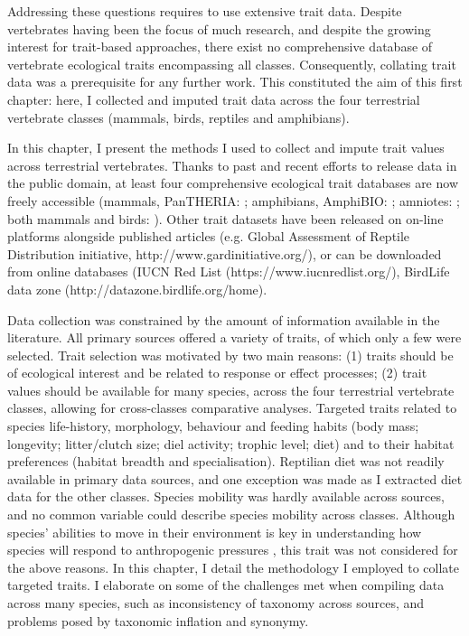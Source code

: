 Addressing these questions requires to use extensive trait data. Despite vertebrates having been the focus of much research, and despite the growing interest for trait-based approaches, there exist no comprehensive database of vertebrate ecological traits encompassing all classes. Consequently, collating trait data was a prerequisite for any further work. This constituted the aim of this first chapter: here, I collected and imputed trait data across the four terrestrial vertebrate classes (mammals, birds, reptiles and amphibians).

In this chapter, I present the methods I used to collect and impute trait values across terrestrial vertebrates. Thanks to past and recent efforts to release data in the public domain, at least four comprehensive ecological trait databases are now freely accessible (mammals, PanTHERIA: \cite{Jones2009}; amphibians, AmphiBIO: \cite{Oliveira2017}; amniotes: \cite{Myhrvold2015}; both mammals and birds: \cite{Cooke2019}). Other trait datasets have been released on on-line platforms alongside published articles (e.g. Global Assessment of Reptile Distribution initiative, http://www.gardinitiative.org/), or can be downloaded from online databases (IUCN Red List (https://www.iucnredlist.org/), BirdLife data zone (http://datazone.birdlife.org/home). 

Data collection was constrained by the amount of information available in the literature.  All  primary sources offered a variety of traits, of which only a few were selected. Trait selection was motivated by two main reasons: (1) traits should be of ecological interest and be related to response or effect processes; (2) trait values should be available for many species, across the four terrestrial vertebrate classes, allowing for cross-classes comparative analyses. Targeted traits related to species life-history, morphology, behaviour and feeding habits (body mass; longevity; litter/clutch size; diel activity; trophic level; diet) and to their habitat preferences (habitat breadth and specialisation). Reptilian diet was not readily available in primary data sources, and one exception was made as I extracted diet data for the other classes. Species mobility was hardly available across sources, and no common variable could describe species mobility across classes. Although species' abilities to move in their environment is key in understanding how species will respond to anthropogenic pressures \citep{Schloss2012b, Barbet-Massin2012,Pearson2006}, this trait was not considered for the above reasons. In this chapter, I detail the methodology I employed to collate targeted traits. I elaborate on some of the challenges met when compiling data across many species, such as inconsistency of taxonomy across sources, and problems posed by taxonomic inflation and synonymy.

